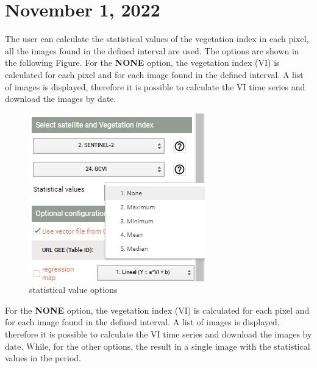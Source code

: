\documentclass[
]{book}
\begin{document}
\hypertarget{november-1-2022}{%
\section{November 1, 2022}\label{november-1-2022}}

The user can calculate the statistical values of the vegetation index in each pixel, all the images found in the defined interval are used. The options are shown in the following Figure. For the \textbf{NONE} option, the vegetation index (VI) is calculated for each pixel and for each image found in the defined interval. A list of images is displayed, therefore it is possible to calculate the VI time series and download the images by date.

\begin{figure}

{\centering \includegraphics{./images/FigureA2} 

}

\caption{statistical value options}\label{fig:figA2}
\end{figure}

For the \textbf{NONE} option, the vegetation index (VI) is calculated for each pixel and for each image found in the defined interval. A list of images is displayed, therefore it is possible to calculate the VI time series and download the images by date. While, for the other options, the result in a single image with the statistical values in the period.
\end{document}
